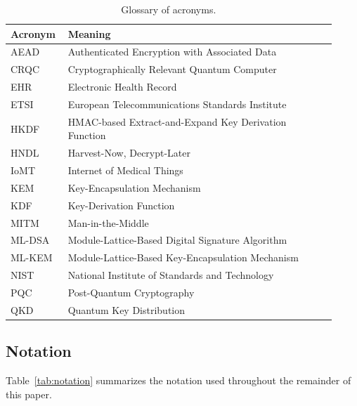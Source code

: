 \documentclass[journal]{IEEEtran}
\begin{document}
\begin{table}[t]
\centering
\caption{Glossary of acronyms.}
\label{tab:glossary}
\small
\begin{tabular}{@{}p{0.14\linewidth}p{0.78\linewidth}@{}}
\toprule
Acronym & Meaning \\
\midrule
AEAD & Authenticated Encryption with Associated Data \\
CRQC & Cryptographically Relevant Quantum Computer \\
EHR & Electronic Health Record \\
ETSI & European Telecommunications Standards Institute \\
HKDF & HMAC-based Extract-and-Expand Key Derivation Function \\
HNDL & Harvest-Now, Decrypt-Later \\
IoMT & Internet of Medical Things \\
KEM & Key-Encapsulation Mechanism \\
KDF & Key-Derivation Function \\
MITM & Man-in-the-Middle \\
ML-DSA & Module-Lattice-Based Digital Signature Algorithm \\
ML-KEM & Module-Lattice-Based Key-Encapsulation Mechanism \\
NIST & National Institute of Standards and Technology \\
PQC & Post-Quantum Cryptography \\
QKD & Quantum Key Distribution \\
\bottomrule
\end{tabular}
\end{table}

\subsection{Notation}

Table~\ref{tab:notation} summarizes the notation used throughout the remainder of this paper.
\end{document}
